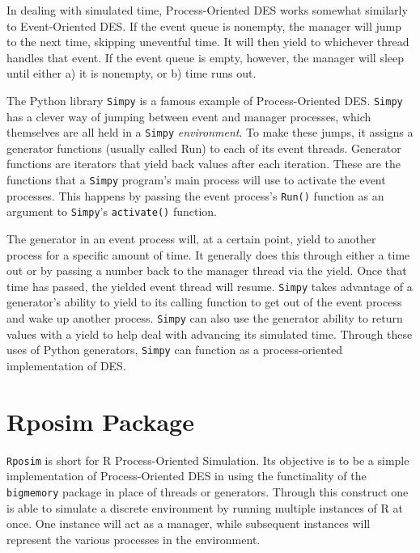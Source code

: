\documentclass[a4paper, 11pt]{article} %
\begin{document}
In dealing with simulated time, Process-Oriented DES works somewhat similarly to Event-Oriented DES. If the event queue is nonempty, the manager will jump to the next time, skipping uneventful time. It will then yield to whichever thread handles that event. If the event queue is empty, however, the manager will sleep until either a) it is nonempty, or b) time runs out. 

The Python library \texttt{Simpy} is a famous example of Process-Oriented DES. \texttt{Simpy} has a clever way of jumping between event and manager processes, which themselves are all held in a \texttt{Simpy} \textit{environment}. To make these jumps, it assigns a generator functions (usually called Run) to each of its event threads. Generator functions are iterators that yield back values after each iteration. These are the functions that a \texttt{Simpy} program’s main process will use to activate the event processes. This happens by passing the event process’s \texttt{Run()} function as an argument to \texttt{Simpy}’s \texttt{activate()} function.

The generator in an event process will, at a certain point, yield to another process for a specific amount of time. It generally does this through either a time out or by passing a number back to the manager thread via the yield. Once that time has passed, the yielded event thread will resume. \texttt{Simpy} takes advantage of a generator’s ability to yield to its calling function to get out of the event process and wake up another process. \texttt{Simpy} can also use the generator ability to return values with a yield to help deal with advancing its simulated time. Through these uses of Python generators, \texttt{Simpy} can function as a process-oriented implementation of DES.


\section{Rposim Package}

\texttt{Rposim} is short for R Process-Oriented Simulation. Its objective is to be a simple implementation of Process-Oriented DES in using the functinality of the \texttt{bigmemory} package in place of threads or generators. Through this construct one is able to simulate a discrete environment by running multiple instances of R at once. One instance will act as a manager, while subsequent instances will represent the various processes in the environment.
\end{document}
